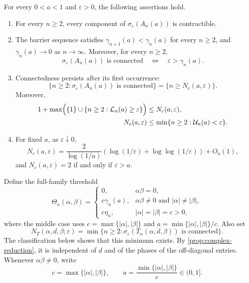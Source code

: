\documentclass[10pt,twoside]{siamart1116}
\numberwithin{equation}{section}
\begin{document}
\begin{theorem}\label{thm:canonical-main}
For every \(0<a<1\) and \(\varepsilon>0\), the following assertions hold.
\begin{enumerate}
\item For every \(n\geq2\), every component of
\(\sigma_\varepsilon(A_n(a))\) is contractible.
\item The barrier sequence satisfies
\(\gamma_{n+1}(a)<\gamma_n(a)\) for every \(n\geq2\), and
\(\gamma_n(a)\to0\) as \(n\to\infty\).  Moreover, for every \(n\geq2\),
\[
 \sigma_\varepsilon(A_n(a))\text{ is connected}
 \quad\Longleftrightarrow\quad \varepsilon>\gamma_n(a).
\]
\item Connectedness persists after its first occurrence:
\[
 \{n\geq2:\sigma_\varepsilon(A_n(a))\text{ is connected}\}
 =\{n\geq N_c(a,\varepsilon)\}.
\]
Moreover,
\begin{equation}\label{eq:N-two-sided-main}
 \begin{aligned}
  1+\max\Bigl(\{1\}\cup
  \{n\geq2:\mathcal L_n(a)\geq\varepsilon\}\Bigr)
  &\leq N_c(a,\varepsilon),\\
  N_c(a,\varepsilon)
  &\leq\min\{n\geq2:\mathcal U_n(a)<\varepsilon\}.
 \end{aligned}
\end{equation}
\item For fixed \(a\), as \(\varepsilon\downarrow0\),
\begin{equation}\label{eq:N-asymptotic-main}
 N_c(a,\varepsilon)=\frac{2}{\log(1/a)}
 \left(\log(1/\varepsilon)+\log\!\log(1/\varepsilon)\right)+O_a(1),
\end{equation}
and \(N_c(a,\varepsilon)=2\) if and only if \(\varepsilon>a\).
\end{enumerate}
\end{theorem}

Define the full-family threshold
\begin{equation}\label{eq:full-threshold}
 \Theta_n(\alpha,\beta)=
 \begin{cases}
  0,&\alpha\beta=0,\\
  c\gamma_n(a),&\alpha\beta\ne0\text{ and }|\alpha|\ne|\beta|,\\
  c\eta_n,&|\alpha|=|\beta|=c>0,
 \end{cases}
\end{equation}
where the middle case uses
\(c=\max\{|\alpha|,|\beta|\}\) and
\(a=\min\{|\alpha|,|\beta|\}/c\).  Also set
\[
 N_T(\alpha,d,\beta;\varepsilon)=
 \min\{n\geq2:\sigma_\varepsilon(T_n(\alpha,d,\beta))
 \text{ is connected}\}.
\]
The classification below shows that this minimum exists.  By
\cref{prop:complex-reduction}, it is independent of \(d\) and of the phases
of the off-diagonal entries.  Whenever \(\alpha\beta\ne0\), write
\[
 c=\max\{|\alpha|,|\beta|\},\qquad
 a=\frac{\min\{|\alpha|,|\beta|\}}{c}\in(0,1].
\]
\end{document}
